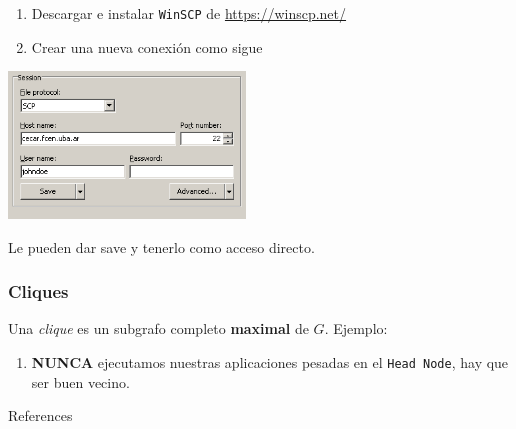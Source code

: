 \documentclass[handout]{beamer}
\begin{document}
\begin{frame}
\begin{enumerate}
  \item Descargar e instalar \Verb=WinSCP= de \url{https://winscp.net/}
  \item Crear una nueva conexión como sigue
\end{enumerate}
\begin{center}
  \includegraphics[width=17em]{winscp-session.png}
  \end{center} 
  Le pueden dar save y tenerlo como acceso directo.
\end{frame}



\begin{frame}
\frametitle{Cliques}
 \begin{definition}[Clique]
 Una \emph{clique} es un subgrafo completo \textbf{maximal} de $G$. Ejemplo:
 \end{definition}
 \begin{enumerate}
 \item \textbf{NUNCA} ejecutamos nuestras aplicaciones pesadas en el \Verb=Head Node=, hay que ser buen vecino.
\end{enumerate}
\end{frame}

\begin{frame}[allowframebreaks]{References}
\def\newblock{}
% 
% 
\end{frame}
\end{document}
